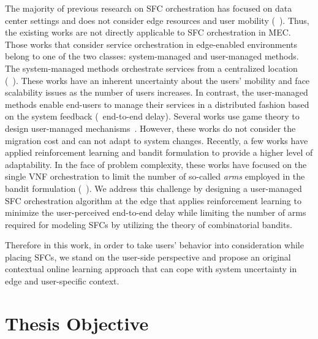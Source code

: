 The majority of previous research on SFC orchestration has focused on data center settings and does not consider edge resources and user mobility (\eg~\cite{minh_tnsm_20}). Thus, the existing works are not directly applicable to SFC orchestration in MEC. Those works that consider service orchestration in edge-enabled environments belong to one of the two classes: system-managed and user-managed methods. The system-managed methods orchestrate services from a centralized location (\eg~\cite{Spatio_temporal_TWC}). These works have an inherent uncertainty about the users' mobility and face scalability issues as the number of users increases. In contrast,  the user-managed methods enable end-users to manage their services in a distributed fashion based on the system feedback (\eg\ end-to-end delay). Several works use game theory to design user-managed mechanisms~\cite{8247219,8567670}. However, these works do not consider the migration cost and can not adapt to system changes. Recently, a few works have applied reinforcement learning and bandit formulation to provide a higher level of adaptability. In the face of problem complexity, these works have focused on the single VNF orchestration to limit the number of so-called \emph{arms} employed in the bandit formulation (\eg~\cite{MABserviceplacement}). We address this challenge by designing a user-managed SFC orchestration algorithm at the edge that applies reinforcement learning to minimize the user-perceived end-to-end delay while limiting the number of arms required for modeling SFCs by utilizing the theory of combinatorial bandits.


%
Therefore in this work, in order to take users' behavior into consideration while placing SFCs, we stand on the user-side perspective and propose an original contextual online learning approach that can cope with system uncertainty in edge and user-specific context.




\section{Thesis Objective}

